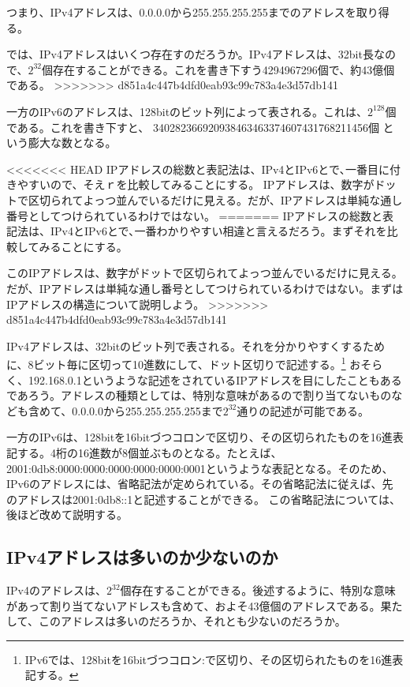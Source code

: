 \begin{itemize}
つまり、IPv4アドレスは、0.0.0.0から255.255.255.255までのアドレスを取り得る。

では、IPv4アドレスはいくつ存在すのだろうか。IPv4アドレスは、32bit長なので、$2^{32}$個存在することができる。これを書き下すう4294967296個で、約43億個である。
>>>>>>> d851a4c447b4dfd0eab93c99c783a4e3d57db141

一方のIPv6のアドレスは、128bitのビット列によって表される。これは、$2^{128}$個である。これを書き下すと、
340282366920938463463374607431768211456個
という膨大な数となる。

<<<<<<< HEAD
IPアドレスの総数と表記法は、IPv4とIPv6とで､一番目に付きやすいので、そえｒを比較してみることにする。
IPアドレスは、数字がドットで区切られてよっつ並んでいるだけに見える。だが、IPアドレスは単純な通し番号としてつけられているわけではない。
=======
IPアドレスの総数と表記法は、IPv4とIPv6とで､一番わかりやすい相違と言えるだろう。まずそれを比較してみることにする。

このIPアドレスは、数字がドットで区切られてよっつ並んでいるだけに見える。だが、IPアドレスは単純な通し番号としてつけられているわけではない。まずはIPアドレスの構造について説明しよう。
>>>>>>> d851a4c447b4dfd0eab93c99c783a4e3d57db141

IPv4アドレスは、32bitのビット列で表される。それを分かりやすくするために、8ビット毎に区切って10進数にして、ドット区切りで記述する。\footnote{IPv6では、128bitを16bitづつコロン:で区切り、その区切られたものを16進表記する。} おそらく、192.168.0.1というような記述をされているIPアドレスを目にしたこともあるであろう。アドレスの種類としては、特別な意味があるので割り当てないものなども含めて、0.0.0.0から255.255.255.255まで$2^{32}$通りの記述が可能である。

一方のIPv6は、128bitを16bitづつコロンで区切り、その区切られたものを16進表記する。4桁の16進数が8個並ぶものとなる。たとえば、2001:0db8:0000:0000:0000:0000:0000:0001というような表記となる。そのため、IPv6のアドレスには、省略記法が定められている。その省略記法に従えば、先のアドレスは2001:0db8::1と記述することができる。
この省略記法については、後ほど改めて説明する。



\subsection{IPv4アドレスは多いのか少ないのか}
IPv4のアドレスは、$2^{32}$個存在することができる。後述するように、特別な意味があって割り当てないアドレスも含めて、およそ43億個のアドレスである。果たして、このアドレスは多いのだろうか、それとも少ないのだろうか。


\end{itemize}
